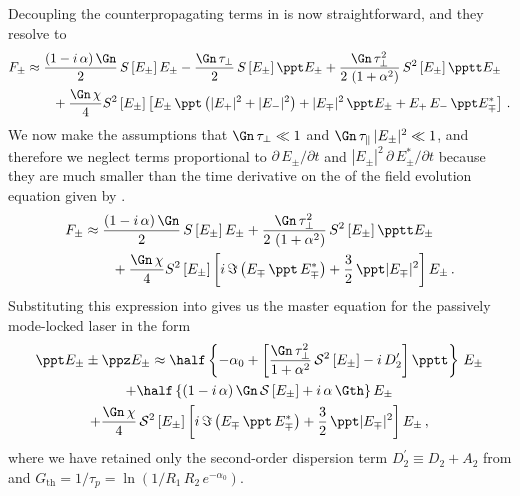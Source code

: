 Decoupling the counterpropagating terms in  is now straightforward, and they resolve to
\begin{equation}
    \begin{split}
        F_\pm &\approx \frac{(1 - i\, \alpha)\, \Gn}{2}\, S\left[E_\pm\right] E_\pm - \frac{\Gn\, \tau_\perp}{2}\, S\left[E_\pm\right] \ppt E_\pm + \frac{\Gn\, \tau_\perp^2}{2\, \left(1 + \alpha^2\right)}\, S^2\left[E_\pm\right] \pptt E_\pm\\
        &\qquad + \frac{\Gn\, \chi}{4}S^2\left[E_\pm\right]  \left[ E_\pm\, \ppt \left( |E_+|^2 + |E_-|^2 \right) + |E_\mp|^2\, \ppt E_\pm + E_+\, E_-\, \ppt E_\mp^\ast \right]\, .
    \end{split}
\end{equation}
We now make the assumptions that $\Gn\, \tau_\perp \ll 1$ and $\Gn\, \tau_\parallel\, |E_\pm|^2 \ll 1$, and therefore we neglect terms proportional to $\partial\, E_\pm/\partial t$ and $|E_\pm|^2\, \partial\, E_\pm^\ast/\partial t$ because they are much smaller than the time derivative on the \lhs of the field evolution equation given by . 
\begin{equation}
    \begin{split}
        F_\pm &\approx \frac{(1 - i\, \alpha)\, \Gn}{2}\, S\left[E_\pm\right] E_\pm + \frac{\Gn\, \tau_\perp^2}{2\, \left(1 + \alpha^2\right)}\, S^2\left[E_\pm\right] \pptt E_\pm\\
        &\qquad + \frac{\Gn\, \chi}{4}S^2\left[E_\pm\right]  \left[ i\, \Im\left(E_\mp\, \ppt\, E_\mp^\ast\right) + \frac{3}{2}\, \ppt |E_\mp|^2 \right] E_\pm\, .
    \end{split}
\end{equation}
Substituting this expression into  gives us the master equation for the passively  mode-locked laser in the form
\begin{multline} \label{eqn:mflt_master_eqn}
    \ppt E_\pm \pm \ppz E_\pm \approx \half \left\{ -\alpha_0 + \left[ \frac{\Gn\, \tau_\perp^2}{1 + \alpha^2}\, \mathcal{S}^2 \left[E_\pm\right] - i\, D_2^\prime \right] \pptt \right\}\, E_\pm \\
    + \half \left\{(1 - i\, \alpha)\, \Gn\, \mathcal{S}\left[E_\pm\right] + i\, \alpha\, \Gth\right\} E_\pm \\
    + \frac{\Gn\, \chi}{4}\, \mathcal{S}^2 \left[E_\pm\right] \left[ i\, \Im\left(E_\mp\, \ppt\, E_\mp^\ast\right) + \frac{3}{2}\, \ppt |E_\mp|^2 \right] E_\pm\, ,
\end{multline}
where we have retained only the second-order dispersion term $D_2^\prime \equiv D_2 + A_2$ from  and $G_\textrm{th} = 1/\tau_p = \ln(1/R_1\, R_2\, e^{-\alpha_0})$.




